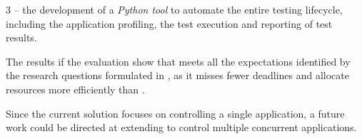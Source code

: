 3 -- the development of a \textit{Python tool} to automate the entire testing lifecycle, including the application profiling, the test execution and reporting of test results. 

The results if the evaluation show that \tool meets all the expectations identified by the research questions formulated in , as it misses fewer deadlines and allocate resources more efficiently than \cSpark. 

 
Since the current solution focuses on controlling a single application, a future work could be directed at extending \tool to control multiple concurrent applications.

